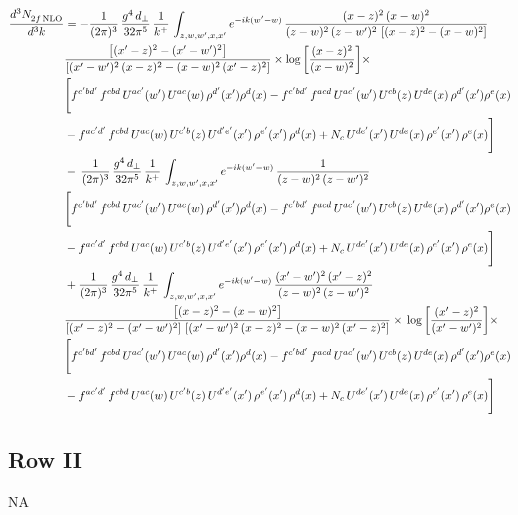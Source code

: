 \documentclass[9pt]{article}
\numberwithin{equation}{section}
\begin{document}
\begin{align}
    \frac{d^{3}N_{2f\,\rm NLO}^{\rm}}{d^{3}k}  & =   - \frac{1}{(2\pi)^{3}}\, \frac{g^{4}\,d_{\perp}}{32\pi^{5}}\,\frac{1}{k^{+}}\,\int_{z,w,w^{\prime},x,x'} e^{-ik(w^{\prime}-w)}\,\frac{(x-z)^{2}\, (x-w)^{2}}{(z-w)^{2}\, (z-w')^{2}\,\left[(x-z)^{2} - (x-w)^{2}\right]}\notag \\ & \frac{\left[(x'-z)^{2}-(x'-w')^{2}\right]}{\left[(x'-w')^{2}\, (x-z)^{2} - (x-w)^{2}\, (x'-z)^{2}\right]}\times \log{\left[\frac{(x-z)^{2}}{(x-w)^{2}}\right]}\times\notag \\ & \Bigg[f^{c'bd'}\,f^{cbd}\, U^{ac'}(w')\,U^{ac}(w)\,\rho^{d'}(x')\rho^{d}(x)- f^{c'bd'}\,f^{acd}\,U^{ac'}(w')\,U^{cb}(z)\,U^{de}(x)\,\rho^{d'}(x')\rho^{e}(x) \notag \\ & -f^{ac'd'}\,f^{cbd}\,U^{ac}(w)\,U^{c'b}(z)\,U^{d'e'}(x')\,\rho^{e'}(x')\,\rho^{d}(x) +N_{c}\,U^{de'}(x')\,U^{de}(x)\,\rho^{e'}(x')\,\rho^{e}(x)\Bigg]  \notag \\
& -\, \frac{1}{(2\pi)^{3}}\, \frac{g^{4}\,d_{\perp}}{32\pi^{5}}\,\frac{1}{k^{+}}\,\int_{z,w,w^{\prime},x,x'} e^{-ik(w^{\prime}-w)}\,\frac{1}{(z-w)^{2}\, (z-w')^{2}}\notag \\ & \Bigg[f^{c'bd'}\,f^{cbd}\, U^{ac'}(w')\,U^{ac}(w)\,\rho^{d'}(x')\rho^{d}(x)- f^{c'bd'}\,f^{acd}\,U^{ac'}(w')\,U^{cb}(z)\,U^{de}(x)\,\rho^{d'}(x')\rho^{e}(x) \notag \\ & -f^{ac'd'}\,f^{cbd}\,U^{ac}(w)\,U^{c'b}(z)\,U^{d'e'}(x')\,\rho^{e'}(x')\,\rho^{d}(x) +N_{c}\,U^{de'}(x')\,U^{de}(x)\,\rho^{e'}(x')\,\rho^{e}(x)\Bigg]  \notag \\
& + \frac{1}{(2\pi)^{3}}\, \frac{g^{4}\,d_{\perp}}{32\pi^{5}}\,\frac{1}{k^{+}}\,\int_{z,w,w^{\prime},x,x'} e^{-ik(w^{\prime}-w)}\,\frac{(x'-w')^{2}\, (x'-z)^{2}}{(z-w)^{2}\, (z-w')^{2}}\notag \\ & \frac{\left[(x-z)^{2} - (x-w)^{2}\right]}{\left[(x'-z)^{2} - (x'-w')^{2}\right]\, \left[(x'-w')^{2}\, (x - z)^{2} - (x-w)^{2}\,(x'-z)^{2}\right]}\times\, \log{\left[\frac{(x'-z)^{2}}{(x'-w')^{2}}\right]}\times \notag \\ &  \Bigg[f^{c'bd'}\,f^{cbd}\, U^{ac'}(w')\,U^{ac}(w)\,\rho^{d'}(x')\rho^{d}(x)- f^{c'bd'}\,f^{acd}\,U^{ac'}(w')\,U^{cb}(z)\,U^{de}(x)\,\rho^{d'}(x')\rho^{e}(x) \notag \\ & -f^{ac'd'}\,f^{cbd}\,U^{ac}(w)\,U^{c'b}(z)\,U^{d'e'}(x')\,\rho^{e'}(x')\,\rho^{d}(x) +N_{c}\,U^{de'}(x')\,U^{de}(x)\,\rho^{e'}(x')\,\rho^{e}(x)\Bigg]
\end{align}
\subsection{Row II}
\textsc{NA}
\end{document}
